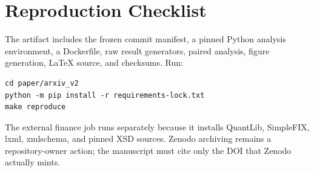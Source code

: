 \documentclass[10pt]{article}
\begin{document}
\appendix
\section{Reproduction Checklist}
The artifact includes the frozen commit manifest, a pinned Python analysis environment, a Dockerfile, raw result generators, paired analysis, figure generation, LaTeX source, and checksums. Run:
\begin{verbatim}
cd paper/arxiv_v2
python -m pip install -r requirements-lock.txt
make reproduce
\end{verbatim}
The external finance job runs separately because it installs QuantLib, SimpleFIX, lxml, xmlschema, and pinned XSD sources. Zenodo archiving remains a repository-owner action; the manuscript must cite only the DOI that Zenodo actually mints.



\end{document}
